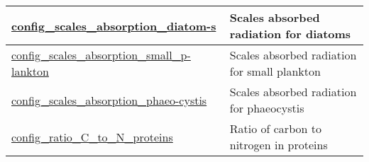 {\begin{center}
\begin{longtable}{| p{2.0in} || p{4.0in} |}
    \hline
    \hyperref[subsec:nm_sec_config_scales_absorption_diatoms]{config\_scales\_absorption\_diatom-}\hyperref[subsec:nm_sec_config_scales_absorption_diatoms]{s}& Scales absorbed radiation for diatoms \\
    \hline
    \hyperref[subsec:nm_sec_config_scales_absorption_small_plankton]{config\_scales\_absorption\_small\_p-}\hyperref[subsec:nm_sec_config_scales_absorption_small_plankton]{lankton}& Scales absorbed radiation for small plankton \\
    \hline
    \hyperref[subsec:nm_sec_config_scales_absorption_phaeocystis]{config\_scales\_absorption\_phaeo-}\hyperref[subsec:nm_sec_config_scales_absorption_phaeocystis]{cystis}& Scales absorbed radiation for phaeocystis \\
    \hline
    \hyperref[subsec:nm_sec_config_ratio_C_to_N_proteins]{config\_ratio\_C\_to\_N\_proteins} & Ratio of carbon to nitrogen in proteins \\
    \hline
\end{longtable}
\end{center}
}

